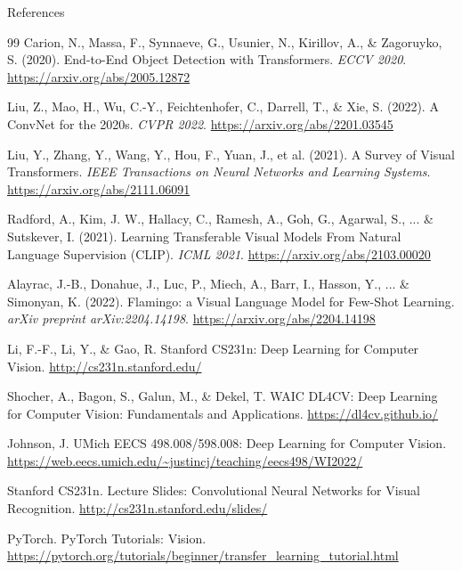\begin{frame}[allowframebreaks]{References}
\begin{thebibliography}{99}
        Carion, N., Massa, F., Synnaeve, G., Usunier, N., Kirillov, A., \& Zagoruyko, S. (2020).
        End-to-End Object Detection with Transformers.
        \emph{ECCV 2020}.
        \url{https://arxiv.org/abs/2005.12872}

        Liu, Z., Mao, H., Wu, C.-Y., Feichtenhofer, C., Darrell, T., \& Xie, S. (2022).
        A ConvNet for the 2020s.
        \emph{CVPR 2022}.
        \url{https://arxiv.org/abs/2201.03545}

        Liu, Y., Zhang, Y., Wang, Y., Hou, F., Yuan, J., et al. (2021).
        A Survey of Visual Transformers.
        \emph{IEEE Transactions on Neural Networks and Learning Systems}.
        \url{https://arxiv.org/abs/2111.06091}

        Radford, A., Kim, J. W., Hallacy, C., Ramesh, A., Goh, G., Agarwal, S., ... \& Sutskever, I. (2021).
        Learning Transferable Visual Models From Natural Language Supervision (CLIP).
        \emph{ICML 2021}.
        \url{https://arxiv.org/abs/2103.00020}

        Alayrac, J.-B., Donahue, J., Luc, P., Miech, A., Barr, I., Hasson, Y., ... \& Simonyan, K. (2022).
        Flamingo: a Visual Language Model for Few-Shot Learning.
        \emph{arXiv preprint arXiv:2204.14198}.
        \url{https://arxiv.org/abs/2204.14198}

        Li, F.-F., Li, Y., \& Gao, R.
        Stanford CS231n: Deep Learning for Computer Vision.
        \url{http://cs231n.stanford.edu/}

        Shocher, A., Bagon, S., Galun, M., \& Dekel, T.
        WAIC DL4CV: Deep Learning for Computer Vision: Fundamentals and Applications.
        \url{https://dl4cv.github.io/}

        Johnson, J.
        UMich EECS 498.008/598.008: Deep Learning for Computer Vision.
        \url{https://web.eecs.umich.edu/~justincj/teaching/eecs498/WI2022/}

        Stanford CS231n.
        Lecture Slides: Convolutional Neural Networks for Visual Recognition.
        \url{http://cs231n.stanford.edu/slides/}

        PyTorch.
        PyTorch Tutorials: Vision.
        \url{https://pytorch.org/tutorials/beginner/transfer_learning_tutorial.html}
    \end{thebibliography}
\end{frame}